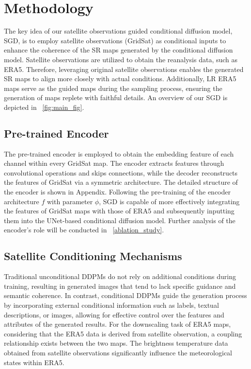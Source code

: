 \section{Methodology}
The key idea of our satellite observations guided conditional diffusion model, SGD, is to employ satellite observations (GridSat) as conditional inputs to enhance the coherence of the SR maps generated by the conditional diffusion model.
Satellite observations are utilized to obtain the reanalysis data, such as ERA5. 
Therefore, leveraging original satellite observations enables the generated SR maps to align more closely with actual conditions. 
Additionally, LR ERA5 maps serve as the guided maps during the sampling process, ensuring the generation of maps replete with faithful details. 
An overview of our SGD is depicted in ~\cref{fig:main_fig}. 

\subsection{Pre-trained Encoder}
The pre-trained encoder is employed to obtain the embedding feature of each channel within every GridSat map. 
The encoder extracts features through convolutional operations and skips connections, while the decoder reconstructs the features of GridSat via a symmetric architecture. 
The detailed structure of the encoder is shown in Appendix. 
Following the pre-training of the encoder architecture $f$ with parameter $\phi$, SGD is capable of more effectively integrating the features of GridSat maps with those of ERA5 and subsequently inputting them into the UNet-based conditional diffusion model. 
Further analysis of the encoder's role will be conducted in ~\cref{ablation_study}. 

\subsection{Satellite Conditioning Mechanisms}
Traditional unconditional DDPMs do not rely on additional conditions during training, resulting in generated images that tend to lack specific guidance and semantic coherence. 
In contrast, conditional DDPMs guide the generation process by incorporating external conditional information such as labels, textual descriptions, or images, allowing for effective control over the features and attributes of the generated results.
For the downscaling task of ERA5 maps, considering that the ERA5 data is derived from satellite observation, a coupling relationship exists between the two maps. 
The brightness temperature data obtained from satellite observations significantly influence the meteorological states within ERA5.

